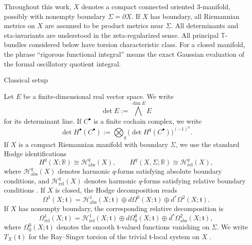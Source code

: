 \documentclass[12pt]{amsart}
\makeatletter
\renewcommand\subsection{\@startsection{subsection}{2}%
  \z@{.5\linespacing\@plus.7\linespacing}{-.5em}%
  {\normalfont\bfseries}}
\numberwithin{equation}{section}
\DeclareMathOperator{\Det}{det}
\makeatother
\begin{document}
Throughout this work, \(X\) denotes a compact connected oriented \(3\)-manifold, possibly with nonempty
boundary \(\Sigma=\partial X\).  If \(X\) has boundary, all Riemannian metrics on \(X\) are assumed to be product metrics
near \(\Sigma\). All determinants and eta-invariants are understood in the zeta-regularized sense. All principal \(\mathbb T\)-bundles considered below have torsion characteristic class. For a closed manifold, the phrase ``rigorous functional integral'' means the exact
Gaussian evaluation of the formal oscillatory quotient integral.


\subsection{Classical setup}

Let \(E\) be a finite-dimensional real vector space. We write
\[
\Det E:=\bigwedge^{\dim E}E
\]
for its determinant line. If \(C^\bullet\) is a finite cochain complex, we write
\[
\Det H^\bullet(C^\bullet)
:=
\bigotimes_q\bigl(\Det H^q(C^\bullet)\bigr)^{(-1)^q}.
\]
If \(X\) is a compact Riemannian manifold with boundary \(\Sigma\), we use the standard
Hodge identifications
\[
H^q(X;\mathbb R)\cong \mathcal H^q_{\mathrm{abs}}(X),
\qquad
H^q(X,\Sigma;\mathbb R)\cong \mathcal H^q_{\mathrm{rel}}(X),
\]
where \(\mathcal H^q_{\mathrm{abs}}(X)\) denotes harmonic \(q\)-forms satisfying absolute
boundary conditions, and \(\mathcal H^q_{\mathrm{rel}}(X)\) denotes harmonic \(q\)-forms
satisfying relative boundary conditions \cite{Manoliu3,BruningMa}. If \(X\) is closed, the Hodge decomposition reads
\begin{equation}
\label{eq:closed-hodge-toral}
\Omega^1(X;\mathfrak t)
=
\mathcal H^1_{\mathrm{abs}}(X;\mathfrak t)\oplus
d\Omega^0(X;\mathfrak t)\oplus
d^*\Omega^2(X;\mathfrak t).
\end{equation}
If \(X\) has nonempty boundary, the corresponding relative decomposition is
\begin{equation}
\label{eq:relative-hodge-toral}
\Omega^1_{\mathrm{rel}}(X;\mathfrak t)
=
\mathcal H^1_{\mathrm{rel}}(X;\mathfrak t)\oplus
d\Omega^0_0(X;\mathfrak t)\oplus
d^*\Omega^2_{\mathrm{abs}}(X;\mathfrak t),
\end{equation}
where \(\Omega^0_0(X;\mathfrak t)\) denotes the smooth \(\mathfrak t\)-valued functions
vanishing on \(\Sigma\). We write $T_X(\mathfrak t)$ for the Ray--Singer torsion of the trivial \(\mathfrak t\)-local system on \(X\) \cite{Ray1971,Muller1978,Cheeger1979}. 
\end{document}
